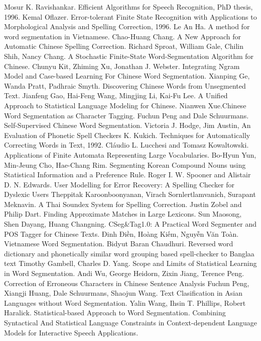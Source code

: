 \documentclass[a4paper]{book} %
\begin{document}
\begin{thebibliography}{}
Mosur K. Ravishankar. Efficient Algorithms for
  Speech Recognition, PhD thesis, 1996.
Kemal Oflazer. Error-tolerant Finite State
  Recognition with Applications to Morphological Analysis and Spelling
  Correction, 1996.
Le An Ha. A method for word segmentation in
  Vietnamese.
Chao-Huang Chang. A New Approach for
  Automatic Chinese Spelling Correction. 
Richard Sproat, William Gale, Chilin Shih, Nancy
  Chang. A Stochastic Finite-State Word-Segmentation Algorithm for
  Chinese.
Chunyu Kit, Zhiming Xu, Jonathan
  J. Webster. Integrating Ngram Model and Case-based Learning For
  Chinese Word Segmentation.
Xianping Ge, Wanda Pratt,
  Padhraic Smyth. Discovering Chinese Words from Unsegmented Text.
Jianfeng Gao, Hai-Feng Wang, Mingjing Li, Kai-Fu
  Lee. A Unified Approach to Statistical Language Modeling for
  Chinese.
\bibitem{}Nianwen Xue.Chinese Word Segmentation as Character Tagging.
Fuchun Peng and Dale Schuurmans. Self-Supervised Chinese
  Word Segmentation.
Victoria J. Hodge, Jim Austin, An Evaluation of
  Phonetic Spell Checkers
K. Kukich. Techniques for Automatically Correcting
  Words in Text, 1992.
\bibitem{}Cláudio L. Lucchesi and Tomasz Kowaltowski. Applications of
  Finite Automata Representing Large Vocabularies.
\bibitem{}Bo-Hyun Yun, Min-Jeung Cho, Hae-Chang Rim. Segmenting Korean
  Compound Nouns using Statistical Information and a Preference Rule.
\bibitem{}Roger I. W. Spooner and Alistair D. N. Edwards. User
  Modelling for Error Recovery: A Spelling Checker for Dyslexic Users
\bibitem{}Theppitak Karoonboonyanan, Virach Sornlertlamvanich,
  Surapant Meknavin. A Thai Soundex System for Spelling Correction.
\bibitem{}Justin Zobel and Philip Dart. Finding Approximate Matches in
  Large Lexicons.
\bibitem{}Sun Maosong, Shen Dayang, Huang Changning. CSeg\&Tag1.0: A
  Practical Word Segmenter and POS Tagger for Chinese Texts.
Đinh Điền, Hoàng Kiếm, Nguyễn Văn Toàn. Vietnamese Word
  Segmentation.
\bibitem{}Bidyut Baran Chaudhuri. Reversed word dictionary and
  phonetically similar word grouping based spell-checker to Banglaa
  text
\bibitem{}Timothy Gambell, Charles D. Yang. Scope and Limits of
  Statistical Learning in Word Segmentation.
Andi Wu, George Heidorn, Zixin Jiang, Terence
  Peng. Correction of Erroneous Characters in Chinese Sentence
  Analysis
\bibitem{}Fuchun Peng, Xiangji Huang, Dale Schuurmans, Shaojun
  Wang. Text Clasification in Asian Languages without Word
  Segmentation. 
\bibitem{}Yalin Wang, Ihsin T. Phillips, Robert
  Haralick. Statistical-based Approach to Word Segmentation.
\bibitem{}Combining Syntactical And Statistical Language Constraints
  in Context-dependent Language Models for Interactive Speech Applications.
\end{thebibliography}
\end{document}
